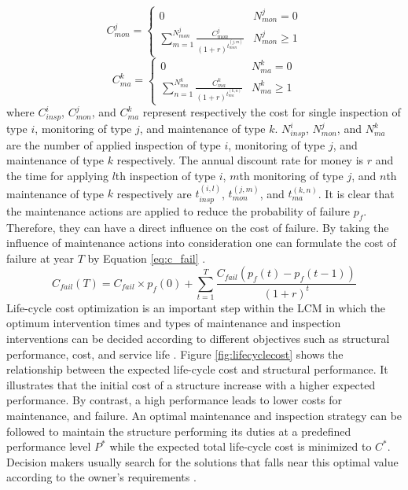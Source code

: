 \begin{equation}
C_{mon}^j =  
\begin{cases}\!%
0  & N_{mon}^j=0\\
\sum_{m=1}^{N_{mon}^j}\frac{C_{mon}^j}{(1+r)^{t_{mon}^{(j,m)}}}  & N_{mon}^j \geq1
\end{cases}
\label{eq:c_mon}
\end{equation}
\begin{equation}
C_{ma}^k =  
\begin{cases}\!%
0  & N_{ma}^k=0\\
\sum_{n=1}^{N_{ma}^k}\frac{C_{ma}^k}{(1+r)^{t_{ma}^{(k,n)}}}  & N_{ma}^k \geq1
\end{cases}
\label{eq:c_ma}
\end{equation}
where $C_{insp}^i$, $C_{mon}^j$, and $C_{ma}^k$ represent respectively the cost for single inspection of type $i$, monitoring of type $j$, and maintenance of type $k$. $N_{insp}^i $, $N_{mon}^j$, and $N_{ma}^k$ 
are the number of applied inspection of type $i$, monitoring of type $j$, and maintenance of type $k$ respectively. The annual discount rate for money is $r$ and the time for applying $l$th inspection of type $i$,
$m$th monitoring of type $j$, and $n$th maintenance of type $k$ respectively are $t_{insp}^{(i, l)}$, $t_{mon}^{(j,m)}$, and $t_{ma}^{(k,n)}$. It is clear that the maintenance actions are applied to reduce 
the probability of failure $p_f$. Therefore, they can have a direct influence on the cost of failure. By taking the influence of maintenance actions into consideration one can formulate the cost of failure at 
year $T$ by Equation \ref{eq:c_fail} \citep{ORCESI201126}. 
\begin{equation}
 C_{fail}(T) = C_{fail}\times p_f(0) + \sum_{t=1}^{T}\frac{C_{fail}(p_f(t)-p_f(t-1))}{(1+r)^t} 
 \label{eq:c_fail}
\end{equation}
\noindent
Life-cycle cost optimization is an important step within the LCM in which the optimum intervention times and types of maintenance and inspection interventions can be decided according to different 
objectives such as structural performance, cost, and service life \citep{Liu2005, Frang2007}. Figure \ref{fig:lifecyclecost} shows the relationship between the expected life-cycle cost and structural 
performance. It illustrates that the initial cost of a structure increase with a higher expected performance. By contrast, a high performance leads to lower costs for maintenance, and failure. An optimal 
maintenance and inspection strategy can be followed to maintain the structure performing its duties at a predefined performance level $P^*$ while the expected total life-cycle cost is minimized to $C^*$. 
Decision makers usually search for the solutions that falls near this optimal value according to the owner's requirements \citep{Frangopol1997}.  

